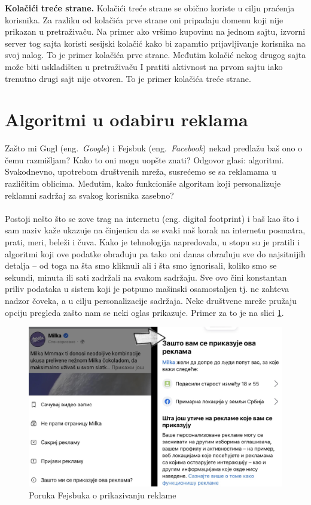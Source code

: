 \documentclass[a4paper]{article}
\begin{document}
	\textbf{Kolačići treće strane.} Kolačići treće strane se obično koriste u cilju praćenja korisnika. Za razliku od kolačića prve strane oni pripadaju domenu koji nije prikazan u pretraživaču. Na primer ako vršimo kupovinu na jednom sajtu, izvorni server tog sajta koristi sesijski kolačić kako bi zapamtio prijavljivanje korisnika na svoj nalog. To je primer kolačića prve strane. Međutim kolačić nekog drugog sajta može biti uskladišten u pretraživaču I pratiti aktivnost na prvom sajtu iako trenutno drugi sajt nije otvoren. To je primer kolačića treće strane. 
	
	\section{Algoritmi u odabiru reklama}
	\label{sec:algoritmi}
	Zašto mi Gugl (eng.~{\em Google}) i Fejsbuk (eng.~{\em Facebook}) nekad predlažu baš ono o čemu razmišljam? Kako to oni mogu uopšte znati? Odgovor glasi: algoritmi. Svakodnevno, upotrebom društvenih mreža, susrećemo se sa reklamama u različitim oblicima. Međutim, 		kako funkcioniše algoritam koji personalizuje reklamni sadržaj za svakog korisnika zasebno?\\ \\
	Postoji nešto što se zove trag na internetu (eng. digital footprint) i baš kao što i sam naziv kaže ukazuje na činjenicu da se svaki naš korak na internetu posmatra, prati, meri, beleži i čuva. Kako je tehnologija napredovala, u stopu su je pratili i algoritmi koji ove podatke 		obrađuju pa tako oni danas obrađuju sve do najsitnijih detalja – od toga na šta smo kliknuli ali i šta smo ignorisali, koliko smo se sekundi, minuta ili sati zadržali na svakom sadržaju. Sve ovo čini konstantan priliv podataka u sistem koji je potpuno mašinski osamostaljen tj. ne 		zahteva nadzor čoveka, a u cilju personalizacije sadržaja. Neke društvene mreže pružaju opciju pregleda zašto nam se neki oglas prikazuje. Primer za to je na slici \ref{fig:zastoreklama}. \\
	\begin{figure}[h!]
		\begin{center}
			\includegraphics[scale=0.1]{zastoreklama.jpg}
		\end{center}
		\caption{Poruka Fejsbuka o prikazivanju reklame}
		\label{fig:zastoreklama}
	\end{figure}\\
\end{document}
